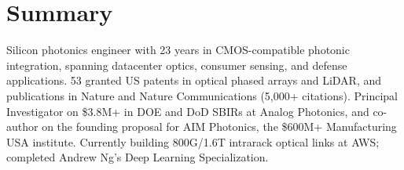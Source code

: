 \section{Summary}
Silicon photonics engineer with 23 years in CMOS-compatible photonic integration, spanning datacenter optics, consumer sensing, and defense applications. 53 granted US patents in optical phased arrays and LiDAR, and publications in Nature and Nature Communications (5,000+ citations). Principal Investigator on \$3.8M+ in DOE and DoD SBIRs at Analog Photonics, and co-author on the founding proposal for AIM Photonics, the \$600M+ Manufacturing USA institute. Currently building 800G/1.6T intrarack optical links at AWS; completed Andrew Ng's Deep Learning Specialization.